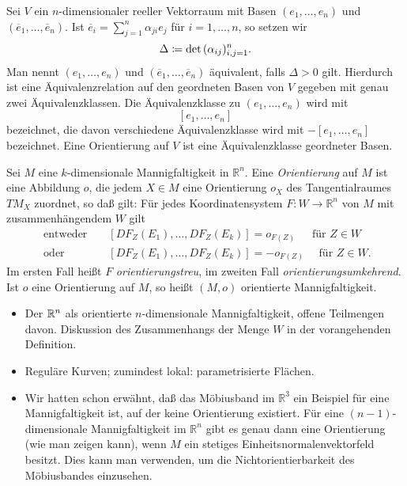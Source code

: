\documentclass[a4paper,twoside,DIV15,BCOR12mm]{scrbook}
\begin{document}
\noindent
Sei $V$ ein $n$-dimensionaler reeller Vektorraum mit Basen 
$(e_{1},\dots,e_{n})$ und 
$(\overline{e}_{1},\dots,\overline{e}_{n})$.  
 Ist $\overline{e}_{i} = \sum_{j=1}^{n} 
\alpha_{ji}e_{j}$ für $i = 1,\dots,n$, so setzen wir
\[ \Delta \da  {\rm det}\, (\alpha_{ij})_{i,j=1}^{n}. \]
Man nennt $(e_{1},\dots,e_{n})$ und 
$(\overline{e}_{1},\dots,\overline{e}_{n})$ äquivalent, falls 
$\Delta > 0$ gilt. Hierdurch ist eine Äquivalenzrelation auf den 
geordneten Basen von $V$ gegeben mit genau zwei Äquivalenzklassen. 
Die Äquivalenzklasse zu $(e_{1},\dots,e_{n})$ wird mit
\[ [e_{1},\dots,e_{n}] \]
bezeichnet, die davon verschiedene Äquivalenzklasse wird mit 
$-[e_{1},\dots,e_{n}]$ bezeichnet. Eine Orientierung auf $V$ ist eine 
Äquivalenzklasse geordneter Basen.\\

\bigskip

 Sei $M$ eine $k$-dimensionale 
Mannigfaltigkeit in ${\mathbb R}^{n}$. Eine 
{\em Orientierung} auf $M$ ist 
eine Abbildung $o$, die jedem $X \in M$ eine Orientierung 
$o_{X}$ des Tangentialraumes $TM_{X}$ zuordnet, so daß gilt: Für 
jedes Koordinatensystem $F: W \to {\mathbb R}^{n}$ von $M$ mit 
zusammenhängendem $W$ gilt
\begin{eqnarray*}
\mbox{ entweder } &   & [DF_{Z}(E_{1}),\dots,DF_{Z}(E_{k})] = 
o_{F(Z)} \quad \, \mbox{ für } Z \in W \\
\mbox{ oder } &   & [DF_{Z}(E_{1}),\dots,DF_{Z}(E_{k})] = -o_{F(Z)} 
\quad \mbox{ für } Z \in W.
\end{eqnarray*}
Im ersten Fall heißt $F$ {\em orientierungstreu}, im zweiten Fall 
{\em orientierungsumkehrend}. Ist $o$ eine Orientierung auf $M$, so 
heißt $(M, o)$ orientierte Mannigfaltigkeit.

\bigskip

 \begin{itemize}
\item Der $\mathbb{R}^n$ als orientierte $n$-dimensionale Mannigfaltigkeit, offene 
Teilmengen davon. Diskussion des Zusammenhangs der Menge $W$ in der vorangehenden 
Definition.
\item Reguläre Kurven; zumindest lokal: parametrisierte Flächen.
\item Wir hatten schon erwähnt, daß das 
Möbiusband im ${\mathbb R}^{3}$ ein Beispiel für eine 
Mannigfaltigkeit ist, auf der keine Orientierung existiert. Für 
eine $(n-1)$-dimensionale Mannigfaltigkeit im ${\mathbb R}^{n}$ gibt 
es genau dann eine Orientierung (wie man zeigen kann), wenn $M$ ein stetiges 
Einheitsnormalenvektorfeld besitzt. Dies kann man verwenden, um die 
Nichtorientierbarkeit des Möbiusbandes einzusehen.
\end{itemize}
\end{document}
